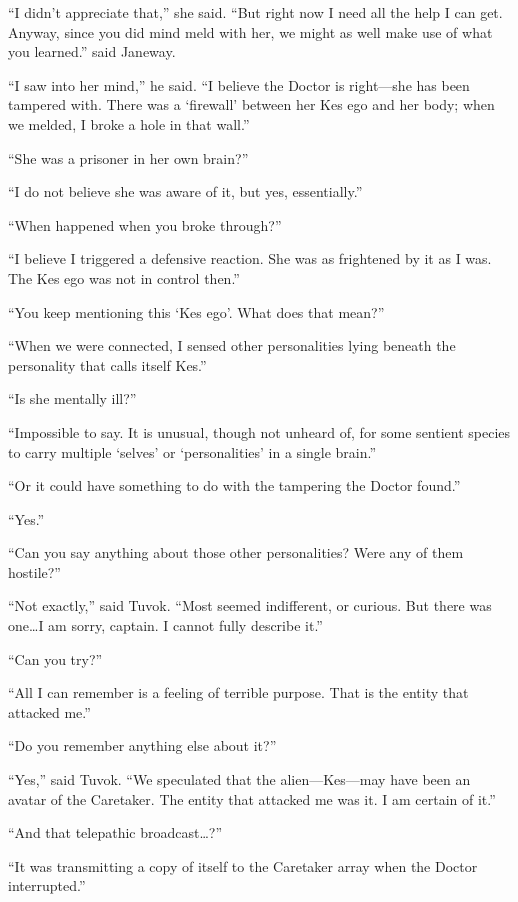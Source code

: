 \documentclass[twoside,letterpaper,12pt]{memoir}
\begin{document}
``I didn't appreciate that,'' she said. ``But right now I need all the help I can get. Anyway, since you did mind meld with her, we might as well make use of what you learned.'' said Janeway. 

``I saw into her mind,'' he said. ``I believe the Doctor is right---she has been tampered with. There was a `firewall' between her Kes ego and her body; when we melded, I broke a hole in that wall.'' 

``She was a prisoner in her own brain?'' 

``I do not believe she was aware of it, but yes, essentially.'' 

``When happened when you broke through?'' 

``I believe I triggered a defensive reaction. She was as frightened by it as I was. The Kes ego was not in control then.'' 

``You keep mentioning this `Kes ego'. What does that mean?'' 

``When we were connected, I sensed other personalities lying beneath the personality that calls itself Kes.'' 

``Is she mentally ill?'' 

``Impossible to say. It is unusual, though not unheard of, for some sentient species to carry multiple `selves' or `personalities' in a single brain.'' 

``Or it could have something to do with the tampering the Doctor found.'' 

``Yes.'' 

``Can you say anything about those other personalities? Were any of them hostile?'' 

``Not exactly,'' said Tuvok. ``Most seemed indifferent, or curious. But there was one\ldots I am sorry, captain. I cannot fully describe it.'' 

``Can you try?'' 

``All I can remember is a feeling of terrible purpose. That is the entity that attacked me.'' 

``Do you remember anything else about it?'' 

``Yes,'' said Tuvok. ``We speculated that the alien---Kes---may have been an avatar of the Caretaker. The entity that attacked me was it. I am certain of it.'' 

``And that telepathic broadcast\ldots ?'' 

``It was transmitting a copy of itself to the Caretaker array when the Doctor interrupted.'' 
\end{document}
